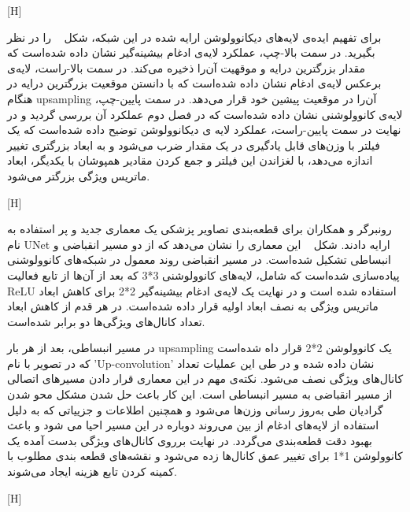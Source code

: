 [H]

برای تفهیم ایده‌ی لایه‌های دیکانوولوشن ارایه شده در این شبکه، شکل ~ را در نظر بگیرید. در سمت بالا-چپ، عملکرد لایه‌ی ادغام بیشینه‌گیر نشان داده شده‌است که مقدار بزرگترین درایه و موقهیت آن‌را ذخیره می‌کند. در سمت بالا-راست، لایه‌ی برعکس لایه‌ی ادغام نشان داده شده‌است که با دانستن موقعیت بزرگترین درایه در هنگام upsampling آن‌را در موقعیت پیشین خود قرار می‌دهد. در سمت پایین-چپ، لایه‌ی کانوولوشنی نشان داده شده‌است که در فصل دوم عملکرد آن بررسی گردید و در نهایت در سمت پایین-راست، عملکرد لایه ی دیکانوولوشن توضیح داده شده‌است که یک فیلتر با وزن‌های قابل یادگیری در یک مقدار ضرب می‌شود و به ابعاد بزرگتری تغییر اندازه می‌دهد، با لغزاندن این فیلتر و جمع کردن مقادیر همپوشان با یکدیگر، ابعاد ماتریس ویژگی بزرگتر می‌شود.

[H]

رونبرگر و همکاران  برای قطعه‌بندی تصاویر پزشکی یک معماری جدید و پر استفاده به نام UNet ارایه دادند. شکل ~ این معماری را نشان می‌دهد که از دو مسیر انقباضی و انبساطی تشکیل شده‌است. در مسیر انقباضی روند معمول در شبکه‌های کانوولوشنی پیاده‌سازی شده‌است که شامل، لایه‌های کانوولوشنی 3*3 که بعد از آن‌ها از تابع فعالیت ReLU استفاده شده است و در نهایت یک لایه‌ی ادغام بیشینه‌گیر 2*2 برای کاهش ابعاد ماتریس ویژگی به نصف ابعاد اولیه قرار داده شده‌است. در هر قدم از کاهش ابعاد تعداد کانال‌های ویژگی‌ها دو برابر شده‌است.

در مسیر انبساطی، بعد از هر بار upsampling یک کانوولوشن 2*2 قرار داه شده‌است که در تصویر با نام 'Up-convolution' نشان داده شده‌ و در طی این عملیات تعداد کانال‌های ویژگی نصف می‌شود. نکته‌ی مهم در این معماری قرار دادن مسیر‌های اتصالی از مسیر انقباضی به مسیر انبساطی است. این کار باعث حل شدن مشکل محو شدن گرادیان طی به‌روز رسانی وزن‌ها می‌شود و همچنین اطلاعات و جزییاتی که به دلیل استفاده از لایه‌های ادغام از بین می‌روند دوباره در این مسیر احیا می شود و باعث بهبود دقت قطعه‌بندی می‌گردد. در نهایت برروی کانال‌های ویژگی بدست آمده یک کانوولوشن 1*1 برای تغییر عمق کانال‌ها زده می‌شود و نقشه‌های قطعه بندی مطلوب با کمینه کردن تابع هزینه ایجاد می‌شوند.

[H]

